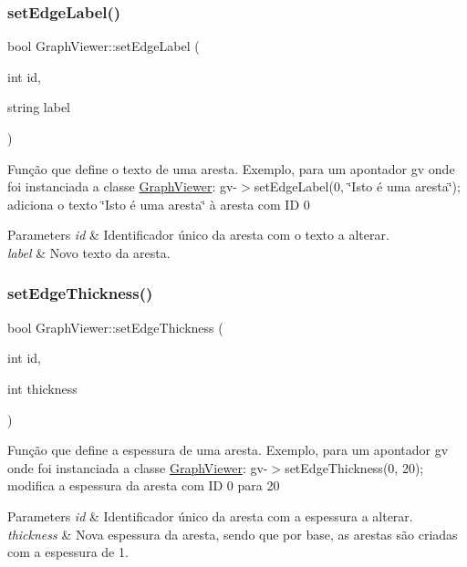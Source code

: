 \subsubsection{\texorpdfstring{set\+Edge\+Label()}{setEdgeLabel()}}
{\footnotesize\ttfamily bool Graph\+Viewer\+::set\+Edge\+Label (\begin{DoxyParamCaption}\item[{int}]{id,  }\item[{string}]{label }\end{DoxyParamCaption})}

Função que define o texto de uma aresta. Exemplo, para um apontador gv onde foi instanciada a classe \mbox{\hyperlink{class_graph_viewer}{Graph\+Viewer}}\+: gv-\/$>$set\+Edge\+Label(0, \char`\"{}\+Isto é uma aresta\char`\"{}); adiciona o texto \char`\"{}\+Isto é uma aresta\char`\"{} à aresta com ID 0


\begin{DoxyParams}{Parameters}
{\em id} & Identificador único da aresta com o texto a alterar. \\
\hline
{\em label} & Novo texto da aresta. \\
\hline
\end{DoxyParams}
\mbox{\label{class_graph_viewer_a07f598272fe3515455eab13be749604a}} 
\subsubsection{\texorpdfstring{set\+Edge\+Thickness()}{setEdgeThickness()}}
{\footnotesize\ttfamily bool Graph\+Viewer\+::set\+Edge\+Thickness (\begin{DoxyParamCaption}\item[{int}]{id,  }\item[{int}]{thickness }\end{DoxyParamCaption})}

Função que define a espessura de uma aresta. Exemplo, para um apontador gv onde foi instanciada a classe \mbox{\hyperlink{class_graph_viewer}{Graph\+Viewer}}\+: gv-\/$>$set\+Edge\+Thickness(0, 20); modifica a espessura da aresta com ID 0 para 20


\begin{DoxyParams}{Parameters}
{\em id} & Identificador único da aresta com a espessura a alterar. \\
\hline
{\em thickness} & Nova espessura da aresta, sendo que por base, as arestas são criadas com a espessura de 1. \\
\hline
\end{DoxyParams}
\mbox{\label{class_graph_viewer_ac211de009a0afe2e6d44f4f8d030a2cc}} 
